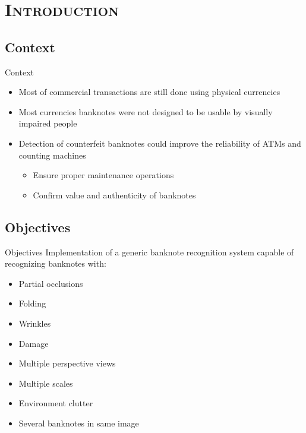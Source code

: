 \section{\scshape Introduction}\label{sec:introduction}

\subsection{Context}
\begin{frame}{Context}
	\begin{itemize}
		\item Most of commercial transactions are still done using physical currencies
		\item Most currencies banknotes were not designed to be usable by visually impaired people
		\item Detection of counterfeit banknotes could improve the reliability of ATMs and counting machines
		\begin{itemize}
			\item Ensure proper maintenance operations
			\item Confirm value and authenticity of banknotes
		\end{itemize}
	\end{itemize}
\end{frame}


\subsection{Objectives}
\begin{frame}{Objectives}
	Implementation of a generic banknote recognition system capable of recognizing banknotes with:
	\begin{itemize}
		\item Partial occlusions
		\item Folding
		\item Wrinkles
		\item Damage
		\item Multiple perspective views
		\item Multiple scales
		\item Environment clutter
		\item Several banknotes in same image
	\end{itemize}
\end{frame}
